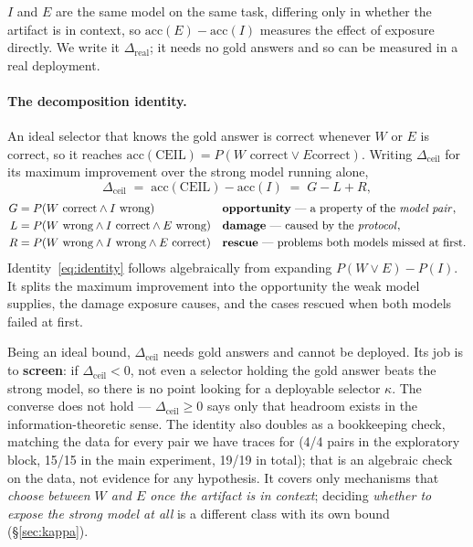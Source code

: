 \documentclass[11pt,a4paper]{article}
\newcommand{\dceil}{\Delta_{\mathrm{ceil}}}
\newcommand{\dhonest}{\Delta_{\mathrm{real}}}
\newcommand{\CEIL}{\mathrm{CEIL}}
\newcommand{\acc}{\mathrm{acc}}
\begin{document}
$I$ and $E$ are the same model on the same task, differing only in whether the artifact is in
context, so $\acc(E)-\acc(I)$ measures the effect of exposure directly. We write it $\dhonest$; it
needs no gold answers and so can be measured in a real deployment.

\paragraph{The decomposition identity.} An ideal selector that knows the gold answer is correct
whenever $W$ or $E$ is correct, so it reaches $\acc(\CEIL) = P(W \text{ correct} \vee E \text{
correct})$. Writing $\dceil$ for its maximum improvement over the strong model running alone,
\begin{equation}\label{eq:identity}
\dceil \;=\; \acc(\CEIL) - \acc(I) \;=\; G - L + R,
\end{equation}
\begin{align*}
G &= P(W \text{ correct} \wedge I \text{ wrong})
  &&\text{\textbf{opportunity} --- a property of the \emph{model pair}},\\
L &= P(W \text{ wrong} \wedge I \text{ correct} \wedge E \text{ wrong})
  &&\text{\textbf{damage} --- caused by the \emph{protocol}},\\
R &= P(W \text{ wrong} \wedge I \text{ wrong} \wedge E \text{ correct})
  &&\text{\textbf{rescue} --- problems both models missed at first}.
\end{align*}
Identity~\eqref{eq:identity} follows algebraically from expanding $P(W \vee E) - P(I)$. It splits
the maximum improvement into the opportunity the weak model supplies, the damage exposure causes,
and the cases rescued when both models failed at first.

Being an ideal bound, $\dceil$ needs gold answers and cannot be deployed. Its job is to
\textbf{screen}: if $\dceil<0$, not even a selector holding the gold answer beats the strong model,
so there is no point looking for a deployable selector $\kappa$. The converse does not hold ---
$\dceil\geq0$ says only that headroom exists in the information-theoretic sense. The identity also
doubles as a bookkeeping check, matching the data for every pair we have traces for (4/4 pairs in
the exploratory block, 15/15 in the main experiment, 19/19 in total); that is an algebraic check on
the data, not evidence for any hypothesis. It covers only mechanisms that \emph{choose between $W$
and $E$ once the artifact is in context}; deciding \emph{whether to expose the strong model at all}
is a different class with its own bound (\S\ref{sec:kappa}).
\end{document}
